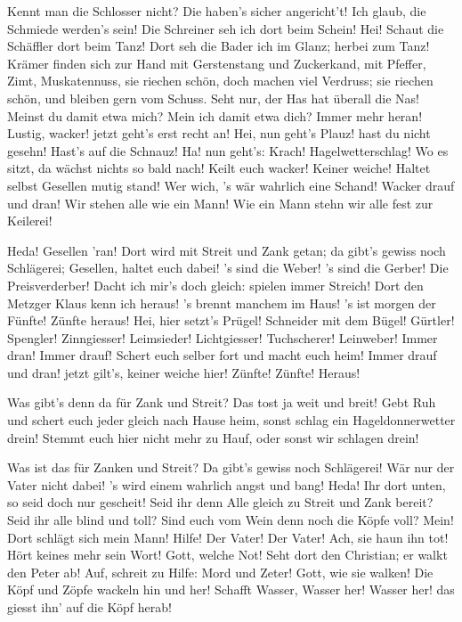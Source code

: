 \begin{drama}

Kennt man die Schlosser nicht?
Die haben's sicher angericht't!
Ich glaub, die Schmiede werden's sein!
Die Schreiner seh ich dort beim Schein!
Hei! Schaut die Schäffler dort beim Tanz!
Dort seh die Bader ich im Glanz;
herbei zum Tanz!
Krämer finden sich zur Hand
mit Gerstenstang und Zuckerkand,
mit Pfeffer, Zimt, Muskatennuss,
sie riechen schön,
doch machen viel Verdruss;
sie riechen schön,
und bleiben gern vom Schuss.
Seht nur, der Has
hat überall die Nas!
Meinst du damit etwa mich?
Mein ich damit etwa dich?
Immer mehr heran!
Lustig, wacker! jetzt geht's erst recht an!
Hei, nun geht's Plauz! hast du nicht gesehn!
Hast's auf die Schnauz!
Ha! nun geht's: Krach! Hagelwetterschlag!
Wo es sitzt, da wächst nichts so bald nach!
Keilt euch wacker! Keiner weiche!
Haltet selbst Gesellen mutig stand!
Wer wich, 's wär wahrlich eine Schand!
Wacker drauf und dran!
Wir stehen alle wie ein Mann!
Wie ein Mann
stehn wir alle fest zur Keilerei!






Heda! Gesellen 'ran!
Dort wird mit Streit und Zank getan;
da gibt's gewiss noch Schlägerei;
Gesellen, haltet euch dabei!
's sind die Weber! 's sind die Gerber!
Die Preisverderber!
Dacht ich mir's doch gleich:
spielen immer Streich!
Dort den Metzger Klaus
kenn ich heraus!
's brennt manchem im Haus!
's ist morgen der Fünfte!
Zünfte heraus!
Hei, hier setzt's Prügel!
Schneider mit dem Bügel!
Gürtler! Spengler! Zinngiesser! 
Leimsieder! Lichtgiesser!
Tuchscherer! Leinweber!
Immer dran! Immer drauf!
Schert euch selber fort
und macht euch heim!
Immer drauf und dran!
jetzt gilt's, keiner weiche hier!
Zünfte! Zünfte! Heraus! 


Was gibt's denn da für Zank und Streit?
Das tost ja weit und breit!
Gebt Ruh und schert
euch jeder gleich nach Hause heim,
sonst schlag ein Hageldonnerwetter drein!
Stemmt euch hier nicht mehr zu Hauf,
oder sonst wir schlagen drein!



Was ist das für Zanken und Streit?
Da gibt's gewiss noch Schlägerei!
Wär nur der Vater nicht dabei!
's wird einem wahrlich angst und bang!
Heda! Ihr dort unten,
so seid doch nur gescheit!
Seid ihr denn Alle gleich
zu Streit und Zank bereit?
Seid ihr alle blind und toll?
Sind euch vom Wein denn
noch die Köpfe voll?
Mein! Dort schlägt sich mein Mann!
Hilfe! Der Vater! Der Vater!
Ach, sie haun ihn tot!
Hört keines mehr sein Wort!
Gott, welche Not!
Seht dort den Christian;
er walkt den Peter ab!
Auf, schreit zu Hilfe: Mord und Zeter! 
Gott, wie sie walken!
Die Köpf und Zöpfe wackeln hin und her!
Schafft Wasser, Wasser her! Wasser her!
das giesst ihn' auf die Köpf herab!



\end{drama}
